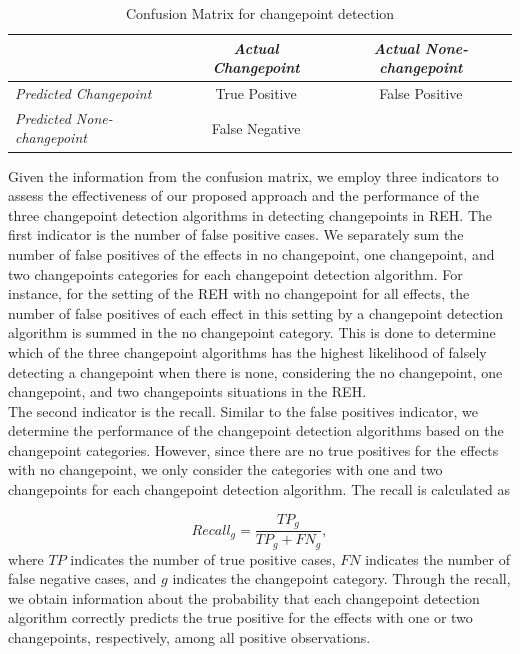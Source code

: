 \documentclass[]{interact}
\theoremstyle{plain}%
\theoremstyle{definition}
\theoremstyle{remark}
\begin{document}
{	\begin{table}[H]
	\centering
	\renewcommand{\arraystretch}{1.5} %
	\small
	\begin{tabular}{l|c|c}
		\hline
		& \textit{Actual Changepoint} & \textit{Actual None-changepoint}                   \\ \hline
		\textit{Predicted Changepoint} & True Positive              & False Positive                               \\ \hline
		\textit{Predicted None-changepoint} & False Negative             & \multicolumn{1}{l}{\cellcolor[HTML]{C0C0C0}} \\ \hline
	\end{tabular}
	\caption{Confusion Matrix for changepoint detection}
	\label{Table 3}
    \end{table}
	
	Given the information from the confusion matrix, we employ three indicators to assess the effectiveness of our proposed approach and the performance of the three changepoint detection algorithms in detecting changepoints in REH. The first indicator is the number of false positive cases. We separately sum the number of false positives of the effects in no changepoint, one changepoint, and two changepoints categories for each changepoint detection algorithm. For instance, for the setting of the REH with no changepoint for all effects, the number of false positives of each effect in this setting by a changepoint detection algorithm is summed in the no changepoint category. This is done to determine which of the three changepoint algorithms has the highest likelihood of falsely detecting a changepoint when there is none, considering the no changepoint, one changepoint, and two changepoints situations in the REH. \\
	
	The second indicator is the recall. Similar to the false positives indicator, we determine the performance of the changepoint detection algorithms based on the changepoint categories. However, since there are no true positives for the effects with no changepoint, we only consider the categories with one and two changepoints for each changepoint detection algorithm. The recall is calculated as
	
	\begin{equation} \label{7}
		Recall_g = \frac{TP_g}{TP_g + FN_g},
	\end{equation}
    where $TP$ indicates the number of true positive cases, $FN$ indicates the number of false negative cases, and $g$ indicates the changepoint category. Through the recall, we obtain information about the probability that each changepoint detection algorithm correctly predicts the true positive for the effects with one or two changepoints, respectively, among all positive observations. \\

}
\end{document}
